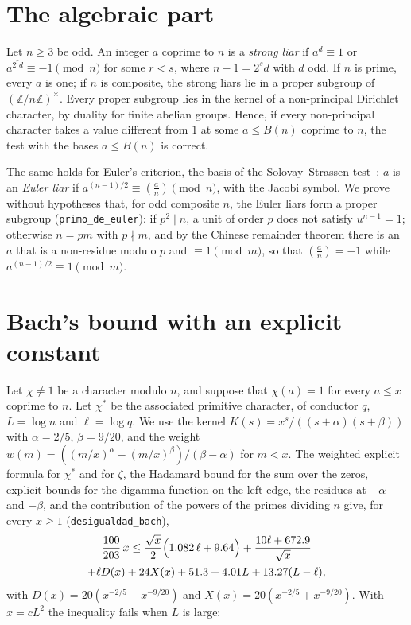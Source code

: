 \documentclass[11pt,a4paper]{amsart}
\theoremstyle{remark}
\newcommand{\Z}{\mathbb{Z}}
\begin{document}
\section{The algebraic part}

Let $n\ge3$ be odd. An integer $a$ coprime to $n$ is a \emph{strong liar} if $a^d\equiv1$ or $a^{2^rd}\equiv-1\pmod n$ for some $r<s$, where $n-1=2^sd$ with $d$ odd. If $n$ is prime, every $a$ is one; if $n$ is composite, the strong liars lie in a proper subgroup of $(\Z/n\Z)^\times$. Every proper subgroup lies in the kernel of a non-principal Dirichlet character, by duality for finite abelian groups. Hence, if every non-principal character takes a value different from $1$ at some $a\le B(n)$ coprime to $n$, the test with the bases $a\le B(n)$ is correct.

The same holds for Euler's criterion, the basis of the Solovay--Strassen test~\cite{SS}: $a$ is an \emph{Euler liar} if $a^{(n-1)/2}\equiv\left(\frac an\right)\pmod n$, with the Jacobi symbol. We prove without hypotheses that, for odd composite $n$, the Euler liars form a proper subgroup (\texttt{primo\_de\_euler}): if $p^2\mid n$, a unit of order $p$ does not satisfy $u^{n-1}=1$; otherwise $n=pm$ with $p\nmid m$, and by the Chinese remainder theorem there is an $a$ that is a non-residue modulo $p$ and $\equiv1\pmod m$, so that $\left(\frac an\right)=-1$ while $a^{(n-1)/2}\equiv1\pmod m$.

\section{Bach's bound with an explicit constant}

Let $\chi\ne1$ be a character modulo $n$, and suppose that $\chi(a)=1$ for every $a\le x$ coprime to $n$. Let $\chi^*$ be the associated primitive character, of conductor $q$, $L=\log n$ and $\ell=\log q$. We use the kernel $K(s)=x^s/((s+\alpha)(s+\beta))$ with $\alpha=2/5$, $\beta=9/20$, and the weight $w(m)=((m/x)^\alpha-(m/x)^\beta)/(\beta-\alpha)$ for $m<x$. The weighted explicit formula for $\chi^*$ and for $\zeta$, the Hadamard bound for the sum over the zeros, explicit bounds for the digamma function on the left edge, the residues at $-\alpha$ and $-\beta$, and the contribution of the powers of the primes dividing $n$ give, for every $x\ge1$ (\texttt{desigualdad\_bach}),
\begin{multline*}
\frac{100}{203}\,x\le\frac{\sqrt x}2\Bigl(1.082\,\ell+9.64\Bigr)+\frac{10\ell+672.9}{\sqrt x}\\
+\ell D(x)+24X(x)+51.3+4.01L+13.27(L-\ell),
\end{multline*}
with $D(x)=20(x^{-2/5}-x^{-9/20})$ and $X(x)=20(x^{-2/5}+x^{-9/20})$. With $x=cL^2$ the inequality fails when $L$ is large:
\end{document}
